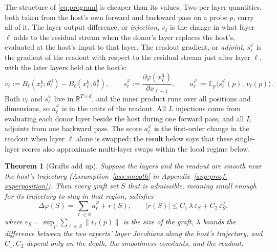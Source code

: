 \documentclass{article}
\theoremstyle{plain}
\newtheorem{theorem}{Theorem}
\theoremstyle{definition}
\theoremstyle{remark}
\newcommand{\host}{\mathrm{h}}
\newcommand{\donor}{\mathrm{d}}
\newcommand{\Rb}{\mathbb{R}}
\newcommand{\Ex}{\mathbb{E}}
\begin{document}
The structure of \eqref{eq:program} is cheaper than its values. Two per-layer
quantities, both taken from the host's own forward and backward pass on a probe
$p$, carry all of it. The layer output difference, or \emph{injection}, $v_\ell$
is the change in what layer
$\ell$ adds to the residual stream when the donor's layer replaces the host's,
evaluated at the host's input to that layer. The readout gradient, or \emph{adjoint},
$s^{\varphi}_\ell$ is the gradient of the readout with respect to the residual
stream just after layer $\ell$, with the later layers held at the host's:
\begin{equation}
\label{def:injection}
v_\ell := B_\ell\!\left(x^{\host}_\ell;\theta^{\donor}_\ell\right)-B_\ell\!\left(x^{\host}_\ell;\theta^{\host}_\ell\right),
\qquad
s^{\varphi}_\ell := \frac{\partial\varphi\!\left(x^{\host}_L\right)}{\partial x_{\ell+1}},
\qquad
a^{\varphi}_\ell := \Ex_p\big\langle s^{\varphi}_\ell(p),\,v_\ell(p)\big\rangle .
\end{equation}
Both $v_\ell$ and $s^{\varphi}_\ell$ live in $\Rb^{T\times d}$, and the inner
product runs over all positions and dimensions, so $a^{\varphi}_\ell$ is in the
units of the readout. All $L$ injections come from evaluating each donor layer
beside the host during one forward pass, and all $L$ adjoints from one backward
pass. The score $a^{\varphi}_\ell$ is the first-order change in the readout when
layer $\ell$ alone is swapped; the result below says that these single-layer
scores also approximate multi-layer swaps within the local regime below.

\begin{theorem}[Grafts add up]
\label{thm:superposition}
Suppose the layers and the readout are smooth near the host's trajectory
(Assumption~\ref{ass:smooth} in Appendix~\ref{app:proof-superposition}). Then
every graft set $S$ that is admissible, meaning small enough for its trajectory
to stay in that region, satisfies
\begin{equation}
\label{eq:superposition}
\Delta\varphi(S)=\sum_{\ell\in S}a^{\varphi}_\ell+r(S),
\qquad
|r(S)|\le C_1\,\lambda\,\varepsilon_S+C_2\,\varepsilon_S^{2},
\end{equation}
where $\varepsilon_S=\sup_p\sum_{\ell\in S}\|v_\ell(p)\|$ is the size of the
graft, $\lambda$ bounds the difference between the two experts' layer Jacobians
along the host's trajectory, and $C_1,C_2$ depend only on the depth, the
smoothness constants, and the readout.
\end{theorem}
\end{document}
